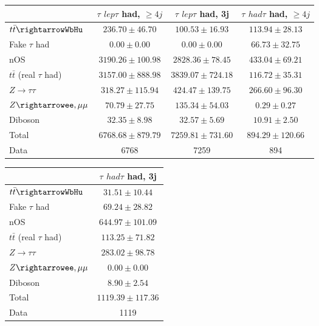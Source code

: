 \begin{table}
\begin{center}
  \begin{tabular}{ | l |  c |  c |  c | }
    \hline \hline 
     &  $\tau$ ${lep}\tau$ {had}, $\geq4j$  &  $\tau$ ${lep}\tau$ {had}, 3j  &  $\tau$ ${had}\tau$ {had}, $\geq4j$  \\ 
    \hline 
     $t\bar{t}\rightarrowWbHu$  &   $ 236.70 \pm 46.70 $ &   $ 100.53 \pm 16.93 $ &   $ 113.94 \pm 28.13 $ \\ 
     Fake $\tau$ {had}  &   $ 0.00 \pm 0.00 $ &   $ 0.00 \pm 0.00 $ &   $ 66.73 \pm 32.75 $ \\ 
    nOS  &   $ 3190.26 \pm 100.98 $ &   $ 2828.36 \pm 78.45 $ &   $ 433.04 \pm 69.21 $ \\ 
     $t\bar{t}$ (real $\tau$ {had})  &   $ 3157.00 \pm 888.98 $ &   $ 3839.07 \pm 724.18 $ &   $ 116.72 \pm 35.31 $ \\ 
     $Z\rightarrow\tau\tau$  &   $ 318.27 \pm 115.94 $ &   $ 424.47 \pm 139.75 $ &   $ 266.60 \pm 96.30 $ \\ 
     $Z\rightarrowee,\mu\mu$  &   $ 70.79 \pm 27.75 $ &   $ 135.34 \pm 54.03 $ &   $ 0.29 \pm 0.27 $ \\ 
    Diboson  &   $ 32.35 \pm 8.98 $ &   $ 32.57 \pm 5.69 $ &   $ 10.91 \pm 2.50 $ \\ 
    Total  &   $ 6768.68 \pm 879.79 $ &   $ 7259.81 \pm 731.60 $ &   $ 894.29 \pm 120.66 $ \\ 
    \hline 
    Data  & 6768  & 7259  & 894  \\ 
    \hline \hline 
  \end{tabular} 


  \begin{tabular}{ | l |  c | }
    \hline \hline 
     &  $\tau$ ${had}\tau$ {had}, 3j  \\ 
    \hline 
     $t\bar{t}\rightarrowWbHu$  &   $ 31.51 \pm 10.44 $ \\ 
     Fake $\tau$ {had}  &   $ 69.24 \pm 28.82 $ \\ 
    nOS  &   $ 644.97 \pm 101.09 $ \\ 
     $t\bar{t}$ (real $\tau$ {had})  &   $ 113.25 \pm 71.82 $ \\ 
     $Z\rightarrow\tau\tau$  &   $ 283.02 \pm 98.78 $ \\ 
     $Z\rightarrowee,\mu\mu$  &   $ 0.00 \pm 0.00 $ \\ 
    Diboson  &   $ 8.90 \pm 2.54 $ \\ 
    Total  &   $ 1119.39 \pm 117.36 $ \\ 
    \hline 
    Data  & 1119  \\ 
    \hline \hline 
  \end{tabular} 


\end{center}
\end{table}
